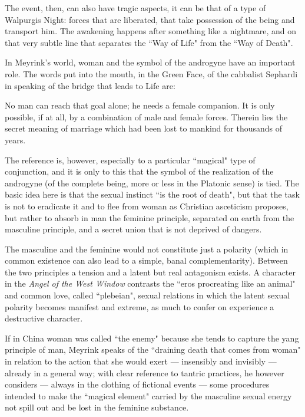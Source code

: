 The event, then, can also have tragic aspects, it can be that of a type of Walpurgis Night: forces that are liberated, that take possession of the being and transport him. The awakening happens after something like a nightmare, and on that very subtle line that separates the ``Way of Life" from the ``Way of Death".

In Meyrink's world, woman and the symbol of the androgyne have an important role. The words put into the mouth, in the Green Face, of the cabbalist Sephardi in speaking of the bridge that leads to Life are:

\begin{quotex}
No man can reach that goal alone; he needs a female companion. It is only possible, if at all, by a combination of male and female forces. Therein lies the secret meaning of marriage which had been lost to mankind for thousands of years. 

\end{quotex}
The reference is, however, especially to a particular ``magical" type of conjunction, and it is only to this that the symbol of the realization of the androgyne (of the complete being, more or less in the Platonic sense) is tied. The basic idea here is that the sexual instinct ``is the root of death", but that the task is not to eradicate it and to flee from woman as Christian asceticism proposes, but rather to absorb in man the feminine principle, separated on earth from the masculine principle, and a secret union that is not deprived of dangers.

The masculine and the feminine would not constitute just a polarity (which in common existence can also lead to a simple, banal complementarity). Between the two principles a tension and a latent but real antagonism exists. A character in the \emph{Angel of the West Window} contrasts the ``eros procreating like an animal" and common love, called ``plebeian", sexual relations in which the latent sexual polarity becomes manifest and extreme, as much to confer on experience a destructive character.

If in China woman was called ``the enemy" because she tends to capture the yang principle of man, Meyrink speaks of the ``draining death that comes from woman" in relation to the action that she would exert — insensibly and invisibly — already in a general way; with clear reference to tantric practices, he however considers — always in the clothing of fictional events — some procedures intended to make the ``magical element" carried by the masculine sexual energy not spill out and be lost in the feminine substance.

